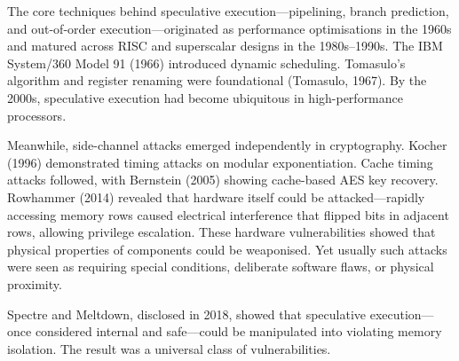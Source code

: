 \begin{historical}
The core techniques behind speculative execution—pipelining, branch prediction, and out-of-order execution—originated as performance optimisations in the 1960s and matured across RISC and superscalar designs in the 1980s–1990s. The IBM System/360 Model 91 (1966) introduced dynamic scheduling. Tomasulo's algorithm and register renaming were foundational (Tomasulo, 1967). By the 2000s, speculative execution had become ubiquitous in high-performance processors.

Meanwhile, side-channel attacks emerged independently in cryptography. Kocher (1996) demonstrated timing attacks on modular exponentiation. Cache timing attacks followed, with Bernstein (2005) showing cache-based AES key recovery. Rowhammer (2014) revealed that hardware itself could be attacked—rapidly accessing memory rows caused electrical interference that flipped bits in adjacent rows, allowing privilege escalation. These hardware vulnerabilities showed that physical properties of components could be weaponised. Yet usually such attacks were seen as requiring special conditions, deliberate software flaws, or physical proximity.

Spectre and Meltdown, disclosed in 2018, showed that speculative execution—once considered internal and safe—could be manipulated into violating memory isolation. The result was a universal class of vulnerabilities.
\end{historical}
